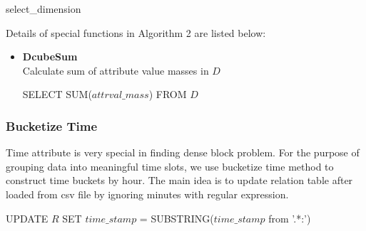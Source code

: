 \begin{algorithm}[H]
\SetAlgoLined
{}
\begin{algorithmic}
 \STATE {}
\STATE {}
\end{algorithmic}
\caption{select\_dimension}
\end{algorithm}

Details of special functions in Algorithm 2 are listed below:
\begin{itemize}
    \item \textbf{DcubeSum} \\
    Calculate sum of attribute value masses in $D$
    \begin{algorithmic}
    \STATE SELECT SUM($attrval\_mass$) FROM $D$
    \end{algorithmic}
\end{itemize}

\subsubsection{Bucketize Time}
Time attribute is very special in finding dense block problem. For the purpose of grouping data into meaningful time slots, we use bucketize time method to construct time buckets by hour.
The main idea is to update relation table after loaded from csv file by ignoring minutes with regular expression. 
\begin{algorithmic}
\STATE UPDATE $R$ SET $time\_stamp$ = SUBSTRING($time\_stamp$ from '.*:')
\end{algorithmic}


